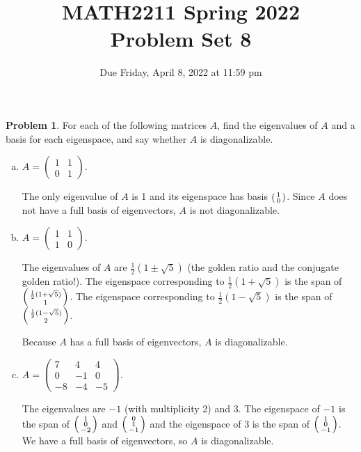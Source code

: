 \documentclass[11pt,oneside]{amsart}
\title{MATH2211 Spring 2022\\
Problem Set 8}
\author{Due Friday, April 8, 2022 at 11:59 pm}
\theoremstyle{definition}
\newtheorem{problem}{Problem}
\newcommand*\colvec[1]{\begin{psmallmatrix}#1\end{psmallmatrix}}
\begin{document}
    \maketitle
    
    \begin{problem}
        For each of the following matrices $A$, find the eigenvalues of $A$ and a basis for each eigenspace, and say whether $A$ is diagonalizable.
        \begin{enumerate}[(a)]
            \item $A=\begin{pmatrix}
                1&1\\0&1
            \end{pmatrix}$.
            \begin{solution}
                The only eigenvalue of $A$ is 1 and its eigenspace has basis $\colvec{1\\0}$. Since $A$ does not have a full basis of eigenvectors, $A$ is not diagonalizable.
            \end{solution}
            \item $A=\begin{pmatrix}
                1&1\\1&0
            \end{pmatrix}$.
            \begin{solution}
                The eigenvalues of $A$ are $\frac 12(1\pm\sqrt5)$ (the golden ratio and the conjugate golden ratio!). The eigenspace corresponding to $\frac 12(1+\sqrt 5)$ is the span of $\colvec{\frac 12(1+\sqrt 5)\\1}$. The eigenspace corresponding to $\frac 12(1-\sqrt 5)$ is the span of $\colvec{\frac12(1-\sqrt 5)\\2}$.

                Because $A$ has a full basis of eigenvectors, $A$ is diagonalizable.
            \end{solution}
            \item $A=\begin{pmatrix}
                7&4&4\\0&-1&0\\-8&-4&-5
            \end{pmatrix}$.
            \begin{solution}
                The eigenvalues are $-1$ (with multiplicity 2) and 3. The eigenspace of $-1$ is the span of $\colvec{1\\0\\-2}$ and $\colvec{0\\1\\-1}$ and the eigenspace of 3 is the span of $\colvec{1\\0\\-1}$. We have a full basis of eigenvectors, so $A$ is diagonalizable.
            \end{solution}
        \end{enumerate}
    \end{problem}
\end{document}
